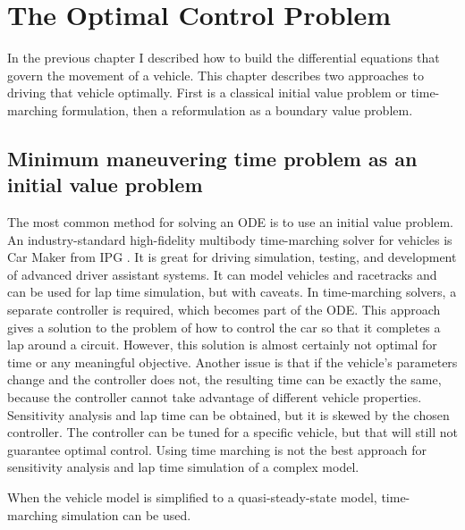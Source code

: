 \chapter{The Optimal Control Problem}
In the previous chapter I described how to build the differential equations that
govern the movement of a vehicle. This chapter describes two approaches to driving that vehicle optimally. First is a classical initial value problem or time-marching formulation, then a reformulation as a boundary value problem.

\section{Minimum maneuvering time problem as an initial value problem}
The most common method for solving an ODE is to use an initial value problem.
An industry-standard high-fidelity multibody time-marching solver for vehicles is Car Maker from IPG \cite{ipg_carmaker}.
It is great for driving simulation, testing, and development of advanced driver assistant systems. It can model vehicles and racetracks and can be used for lap time simulation, but with caveats.
In time-marching solvers, a separate controller is required, which becomes part of the ODE. This approach gives a solution to the problem of how to control the car so that it completes a lap around a circuit. However, this solution is almost certainly not optimal for time or any meaningful objective. Another issue is that if the vehicle's parameters change and the controller does not, the resulting time can be exactly the same, because the controller cannot take advantage of different vehicle properties. Sensitivity analysis and lap time can be obtained, but it is skewed by the chosen controller. The controller can be tuned for a specific vehicle, but that will still not guarantee optimal control. Using time marching is not the best approach for sensitivity analysis and lap time simulation of a complex model.

When the vehicle model is simplified to a quasi-steady-state model, time-marching simulation can be used.



